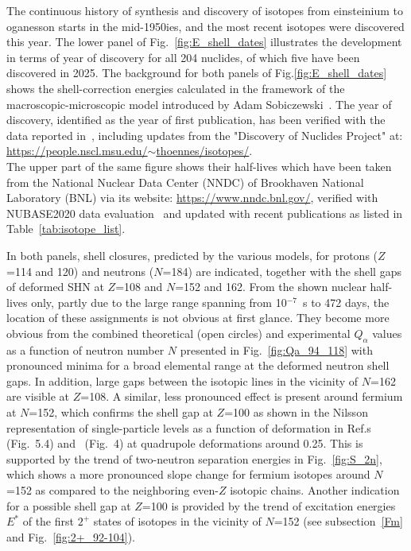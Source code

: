 The continuous history of synthesis and discovery of isotopes from einsteinium to oganesson starts in the mid-1950ies, and the most recent isotopes were discovered this year.
The lower panel of Fig.~\ref{fig:E_shell_dates} illustrates the development in terms of year of discovery for all 204 nuclides, of which five have been discovered in 2025. 
The background for both panels of Fig.\ref{fig:E_shell_dates} shows the shell-correction energies calculated in the framework of the macroscopic-microscopic model introduced by Adam Sobiczewski~\cite{Smolanczuk1995a,Smolanczuk1995}. 
The year of discovery, identified as the year of first publication, has been verified with the data reported in~\cite{Thoennessen2016}, including updates from the "Discovery of Nuclides Project" at:\\
\href{https://people.nscl.msu.edu/~thoennes/isotopes/}{https://people.nscl.msu.edu/$\sim$thoennes/isotopes/}.\\
The upper part of the same figure shows their half-lives which have been taken from the National Nuclear Data Center (NNDC) of Brookhaven National Laboratory (BNL) via its website:  \href{https://www.nndc.bnl.gov/}{https://www.nndc.bnl.gov/}, verified with NUBASE2020 data evaluation~\cite{Kondev2021} and updated with recent publications as listed in Table~\ref{tab:isotope_list}.

In both panels, shell closures, predicted by the various models, for protons ($Z$=114 and 120) and neutrons ($N$=184) are indicated, together with the shell gaps of deformed SHN at $Z$=108 and $N$=152 and 162.
From the shown nuclear half-lives only, partly due to the large range spanning from 10$^{-7}$~s to 472 days, the location of these assignments is not obvious at first glance. 
They become more obvious from the combined theoretical (open circles) and experimental $Q_\alpha$ values as a function of neutron number $N$ presented in Fig.~\ref{fig:Qa_94_118} with pronounced minima for a broad elemental range at the deformed neutron shell gaps.
In addition, large gaps between the isotopic lines in the vicinity of $N$=162 are visible at $Z$=108. 
A similar, less pronounced effect is present around fermium at $N$=152, which confirms the shell gap at $Z$=100 as shown in the Nilsson representation of single-particle levels as a function of deformation in Ref.s~\cite{Bohr1975} (Fig.~5.4) and~\cite{Chasman1977} (Fig.~4) at quadrupole deformations around 0.25.
This is supported by the trend of two-neutron separation energies in Fig.~\ref{fig:S_2n}, which shows a more pronounced slope change for fermium isotopes around $N$=152 as compared to the neighboring even-$Z$ isotopic chains.
Another indication for a possible shell gap at $Z$=100 is provided by the trend of excitation energies $E^*$ of the first $2^+$ states of isotopes in the vicinity of $N$=152 (see subsection~\ref{Fm} and Fig.~\ref{fig:2+_92-104}). 

